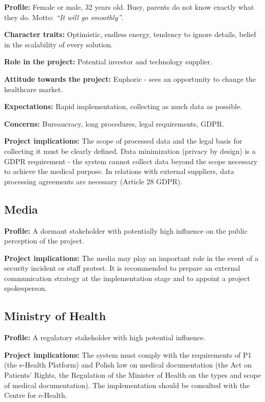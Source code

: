 \textbf{Profile:} Female or male, 32 years old. Busy, parents do not know exactly what they do. Motto: \emph{``It will go smoothly''}.

\textbf{Character traits:} Optimistic, endless energy, tendency to ignore details, belief in the scalability of every solution.

\textbf{Role in the project:} Potential investor and technology supplier.

\textbf{Attitude towards the project:} Euphoric - sees an opportunity to change the healthcare market.

\textbf{Expectations:} Rapid implementation, collecting as much data as possible.

\textbf{Concerns:} Bureaucracy, long procedures, legal requirements, GDPR.

\textbf{Project implications:} The scope of processed data and the legal basis for collecting it must be clearly defined. Data minimization (privacy by design) is a GDPR requirement - the system cannot collect data beyond the scope necessary to achieve the medical purpose. In relations with external suppliers, data processing agreements are necessary (Article 28 GDPR).

\subsection{Media}

\textbf{Profile:} A dormant stakeholder with potentially high influence on the public perception of the project.

\textbf{Project implications:} The media may play an important role in the event of a security incident or staff protest. It is recommended to prepare an external communication strategy at the implementation stage and to appoint a project spokesperson.

\subsection{Ministry of Health}

\textbf{Profile:} A regulatory stakeholder with high potential influence.

\textbf{Project implications:} The system must comply with the requirements of P1 (the e-Health Platform) and Polish law on medical documentation (the Act on Patients' Rights, the Regulation of the Minister of Health on the types and scope of medical documentation). The implementation should be consulted with the Centre for e-Health.


